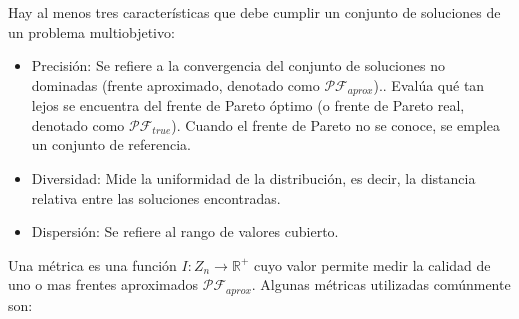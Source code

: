 \documentclass[letterpaper,10pt]{article}
\begin{document}
Hay al menos tres características que debe cumplir un conjunto de soluciones de un problema multiobjetivo:

\begin{itemize}
 \item Precisión: Se refiere a la convergencia del conjunto de soluciones no dominadas (frente aproximado, denotado como $\mathcal{PF}_{aprox}$).. Evalúa qué tan lejos se encuentra del
frente de Pareto óptimo (o frente de Pareto real, denotado como $\mathcal{PF}_{true}$). Cuando el frente de Pareto no se conoce, se emplea un conjunto de referencia.

 \item Diversidad: Mide la uniformidad de la distribución, es decir, la distancia relativa entre las soluciones encontradas.

 \item Dispersión: Se refiere al rango de valores cubierto.
 
\end{itemize}

Una métrica es una función $I:Z_n \rightarrow \mathbb{R}^+$ cuyo valor permite medir la calidad de uno o mas frentes aproximados $\mathcal{PF}_{aprox}$. Algunas métricas utilizadas comúnmente son:
\end{document}
